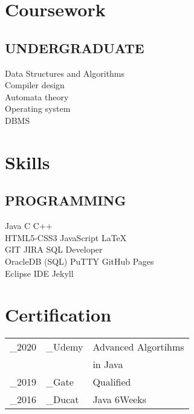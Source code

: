 \documentclass[]{deedy-resume-openfont}
\begin{document}
\begin{minipage}[t]{0.33\textwidth}
\sectionsep


\section{Coursework}
\subsection{UNDERGRADUATE}
Data Structures and Algorithms\\
Compiler design \\
Automata theory\\
Operating system\\
DBMS\\

\sectionsep


\section{Skills}
\subsection{PROGRAMMING}
Java \textbullet{} C \textbullet{} C++ \\
HTML5-CSS3 \textbullet{} JavaScript \textbullet{} \LaTeX\ \\
GIT \textbullet{} JIRA \textbullet {}SQL Developer\\
OracleDB (SQL) \textbullet{} PuTTY \textbullet{} GitHub Pages\\
Eclipse IDE \textbullet{} Jekyll

\sectionsep


\section{Certification}
\begin{tabular}{r l l}
_{2020} & _{Udemy} & Advanced Algortihms \\
& & in Java \\
_{2019} & _{Gate} & Qualified\\
_{2016} & _{Ducat} & Java 6Weeks
\end{tabular}

\sectionsep

%
%

\end{minipage} 
\end{document}
